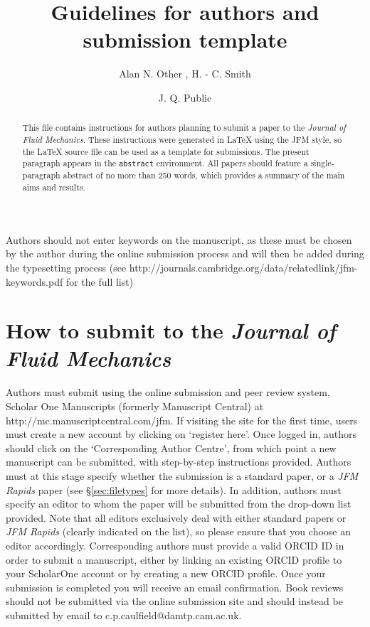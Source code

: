 \documentclass{jfm}
\title{Guidelines for authors and submission template}
\author{Alan N. Other\aff{1}
  \corresp{\email{jfm@damtp.cam.ac.uk}},
  H. - C. Smith\aff{1}
 \and J. Q.  Public\aff{2}}
\affiliation{\aff{1}Department of Chemical Engineering, University of America,
Somewhere, IN 12345, USA
\aff{2}Department of Aerospace and Mechanical Engineering, University of
Camford, Academic Street, Camford CF3 5QL, UK}
\begin{document}
\maketitle

\begin{abstract}
This file contains instructions for authors planning to submit a paper to the {\it Journal of Fluid Mechanics}. These instructions were generated in {\LaTeX} using the JFM style, so the {\LaTeX} source file can be used as a template for submissions. The present paragraph appears in the \verb}abstract} environment. All papers should feature a single-paragraph abstract of no more than 250 words, which provides a summary of the main aims and results. 
\end{abstract}

\begin{keywords}
Authors should not enter keywords on the manuscript, as these must be chosen by the author during the online submission process and will then be added during the typesetting process (see http://journals.cambridge.org/data/\linebreak[3]relatedlink/jfm-\linebreak[3]keywords.pdf for the full list)
\end{keywords}

\section{How to submit to the \textbf{\textit{Journal of Fluid Mechanics}}}
Authors must submit using the online submission and peer review system, Scholar One Manuscripts (formerly Manuscript Central) at http://mc.manuscriptcentral.com/jfm. If visiting the site for the first time, users must create a new account by clicking on `register here'. Once logged in, authors should click on the `Corresponding Author Centre', from which point a new manuscript can be submitted, with step-by-step instructions provided. Authors must at this stage specify whether the submission is a standard paper, or a {\it JFM Rapids} paper (see \S\ref{sec:filetypes} for more details). In addition, authors must specify an editor to whom the paper will be submitted from the drop-down list provided. Note that all editors exclusively deal with either standard papers or {\it JFM Rapids} (clearly indicated on the list), so please ensure that you choose an editor accordingly. Corresponding authors must provide a valid ORCID ID in order to submit a manuscript, either by linking an existing ORCID profile to your ScholarOne account or by creating a new ORCID profile. Once your submission is completed you will receive an email confirmation.  Book reviews should not be submitted via the online submission site and should instead be submitted by email to c.p.caulfield@damtp.cam.ac.uk.
 
\end{document}
